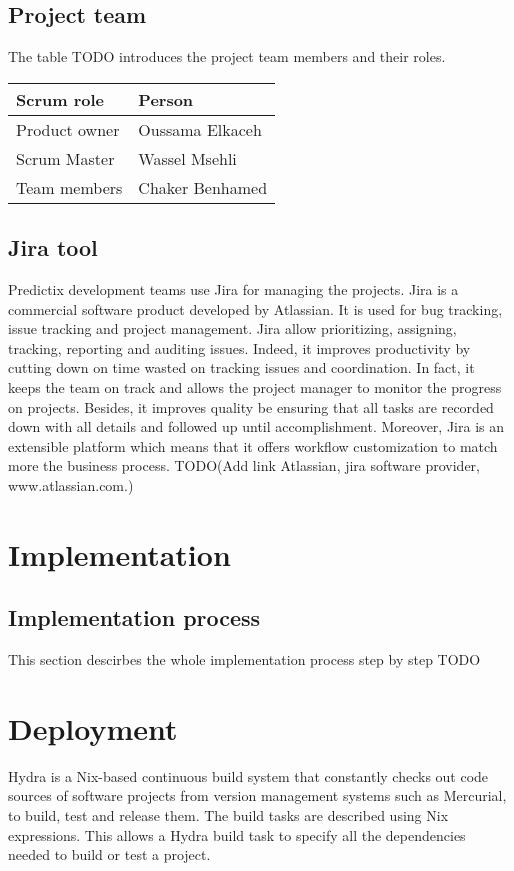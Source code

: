 \subsection{Project team}
The table TODO introduces the project team members and their roles.

\begin{center}
  \begin{tabular}{ | p{3cm}  | p{6cm} |}
    \hline

    Scrum role    & Person          \\ \hline

    Product owner & Oussama Elkaceh \\ \hline
    Scrum Master  & Wassel Msehli   \\ \hline
    Team members  & Chaker Benhamed \\ \hline

    \hline
  \end{tabular}
\end{center}

\subsection{Jira tool}
Predictix development teams use Jira for managing the projects. Jira is a
commercial software product developed by Atlassian. It is used for bug tracking,
issue tracking and project management. Jira allow prioritizing, assigning,
tracking, reporting and auditing issues. Indeed, it improves productivity by
cutting down on time wasted on tracking issues and coordination. In fact, it
keeps the team on track and allows the project manager to monitor the progress
on projects. Besides, it improves quality be ensuring that all tasks are
recorded down with all details and followed up until accomplishment. Moreover,
Jira is an extensible platform which means that it offers workflow customization
to match more the business process. TODO(Add link Atlassian, jira software
provider, www.atlassian.com.)


\section{Implementation}
\subsection{Implementation process}
This section descirbes the whole implementation process step by step TODO

\section{Deployment}
Hydra is a Nix-based continuous build system that constantly checks out code
sources of software projects from version management systems such as Mercurial,
to build, test and release them. The build tasks are described using Nix
expressions. This allows a Hydra build task to specify all the dependencies
needed to build or test a project.

